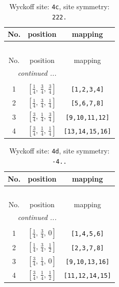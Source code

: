 \documentclass[fleqn,8pt]{jsarticle}
\begin{document}
\renewcommand{\arraystretch}{1.2}
\begin{longtable}{ccc}
\caption{Wyckoff site: {\tt 4c}, site symmetry: {\tt 222.}}
 \\
 \hline \hline
No. & position & mapping \\ \hline \endfirsthead

\multicolumn{2}{l}{\tablename\ \thetable{}} \\
 \hline \hline
No. & position & mapping \\ \hline \endhead

 \hline \hline
\multicolumn{2}{r}{\footnotesize\it continued ...} \\ \endfoot

 \hline \hline
\multicolumn{2}{r}{} \\ \endlastfoot

1 & $\left[ \frac{1}{4},\, \frac{3}{4},\, \frac{3}{4} \right]$ & {\tt [1,2,3,4]} \\ \hline
2 & $\left[ \frac{1}{4},\, \frac{3}{4},\, \frac{1}{4} \right]$ & {\tt [5,6,7,8]} \\ \hline
3 & $\left[ \frac{3}{4},\, \frac{1}{4},\, \frac{3}{4} \right]$ & {\tt [9,10,11,12]} \\ \hline
4 & $\left[ \frac{3}{4},\, \frac{1}{4},\, \frac{1}{4} \right]$ & {\tt [13,14,15,16]} \\
\end{longtable}
\renewcommand{\arraystretch}{1.2}
\begin{longtable}{ccc}
\caption{Wyckoff site: {\tt 4d}, site symmetry: {\tt -4..}}
 \\
 \hline \hline
No. & position & mapping \\ \hline \endfirsthead

\multicolumn{2}{l}{\tablename\ \thetable{}} \\
 \hline \hline
No. & position & mapping \\ \hline \endhead

 \hline \hline
\multicolumn{2}{r}{\footnotesize\it continued ...} \\ \endfoot

 \hline \hline
\multicolumn{2}{r}{} \\ \endlastfoot

1 & $\left[ \frac{1}{4},\, \frac{3}{4},\, 0 \right]$ & {\tt [1,4,5,6]} \\ \hline
2 & $\left[ \frac{1}{4},\, \frac{3}{4},\, \frac{1}{2} \right]$ & {\tt [2,3,7,8]} \\ \hline
3 & $\left[ \frac{3}{4},\, \frac{1}{4},\, 0 \right]$ & {\tt [9,10,13,16]} \\ \hline
4 & $\left[ \frac{3}{4},\, \frac{1}{4},\, \frac{1}{2} \right]$ & {\tt [11,12,14,15]} \\
\end{longtable}
\end{document}
